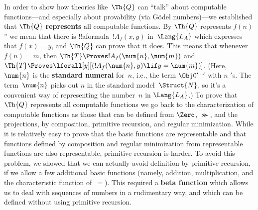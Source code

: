 In order to show how theories like~$\Th{Q}$ can ``talk'' about
computable functions---and especially about provability (via G\"odel
numbers)---we established that $\Th{Q}$ \textbf{represents} all
computable functions. By $\Th{Q}$ represents $f(n)$'' we mean that
there is !!a{formula}~$!A_f(x, y)$ in~$\Lang{L_A}$ which expresses
that $f(x) = y$, and $\Th{Q}$ can prove that it does.  This means that
whenever $f(n) = m$, then $\Th{T} \Proves !A_f(\num{n}, \num{m})$ and
$\Th{T} \Proves \lforall[y][(!A_f(\num{n}, y) \lif y = \num{m})]$.
(Here, $\num{n}$ is the \textbf{standard numeral} for~$n$, i.e., the
term $\Obj 0^{\prime\dots\prime}$ with $n$ $\prime$s. The
term~$\num{n}$ picks out $n$ in the standard model~$\Struct{N}$, so
it's a convenient way of representing the number~$n$ in $\Lang{L_A}$.)
To prove that $\Th{Q}$ represents all computable functions we go back
to the characterization of computable functions as those that can be
defined from $\Zero$, $\Succ$, and the projections, by composition,
primitive recursion, and regular minimization. While it is relatively
easy to prove that the basic functions are representable and that
functions defined by composition and regular minimization from
representable functions are also representable, primitive recursion is
harder. To avoid this problem, we showed that we can actually avoid
definition by primitive recursion, if we allow a few additional basic
functions (namely, addition, multiplication, and the characteristic
function of~$=$). This required a \textbf{beta function} which allows
us to deal with sequences of numbers in a rudimentary way, and which
can be defined without using primitive recursion.
